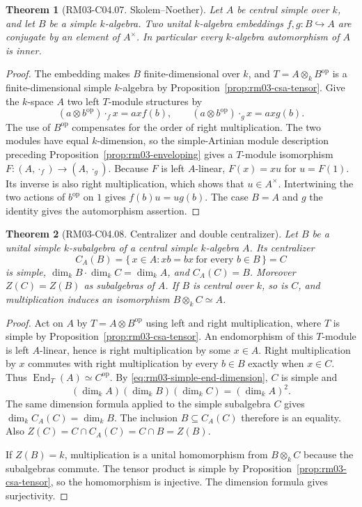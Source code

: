 \documentclass[11pt,oneside,openany]{book}
\newtheorem{theorem}{Theorem}[chapter]
\theoremstyle{definition}
\theoremstyle{remark}
\begin{document}
\begin{theorem}[RM03-C04.07. Skolem--Noether]
\label{thm:rm03-skolem-noether}
Let \(A\) be central simple over \(k\), and let \(B\) be a
simple \(k\)-algebra. Two unital \(k\)-algebra embeddings
\(f,g:B\hookrightarrow A\) are conjugate by an element of \(A^\times\).
In particular every \(k\)-algebra automorphism of \(A\) is inner.
\end{theorem}
\begin{proof}
The embedding makes \(B\) finite-dimensional over \(k\), and
\(T=A\otimes_k B^{\mathrm{op}}\) is a finite-dimensional simple
\(k\)-algebra by Proposition~\ref{prop:rm03-csa-tensor}.
Give the \(k\)-space \(A\) two left \(T\)-module structures by
\[
 (a\otimes b^{\mathrm{op}})\cdot_f x=axf(b),\qquad
 (a\otimes b^{\mathrm{op}})\cdot_g x=axg(b).
\]
The use of \(B^{\mathrm{op}}\) compensates for the order of right
multiplication. The two modules have equal \(k\)-dimension, so the
simple-Artinian module description preceding
Proposition~\ref{prop:rm03-enveloping} gives a \(T\)-module
isomorphism \(F:(A,\cdot_f)\to(A,\cdot_g)\).
Because \(F\) is left \(A\)-linear, \(F(x)=xu\) for \(u=F(1)\).
Its inverse is also right multiplication, which shows that
\(u\in A^\times\). Intertwining the two actions of \(b^{\mathrm{op}}\)
on \(1\) gives \(f(b)u=ug(b)\). The case \(B=A\) and \(g\) the
identity gives the automorphism assertion.
\end{proof}

\begin{theorem}[RM03-C04.08. Centralizer and double centralizer]
\label{thm:rm03-centralizer}
Let \(B\) be a unital simple \(k\)-subalgebra of a central simple
\(k\)-algebra \(A\). Its centralizer
\[
 C_A(B)=\{\,x\in A:xb=bx\ \text{for every }b\in B\,\}=C
\]
is simple, \(\dim_k B\cdot\dim_k C=\dim_k A\), and \(C_A(C)=B\).
Moreover \(Z(C)=Z(B)\) as subalgebras of \(A\).
If \(B\) is central over \(k\), so is \(C\), and multiplication
induces an isomorphism \(B\otimes_k C\simeq A\).
\end{theorem}
\begin{proof}
Act on \(A\) by \(T=A\otimes B^{\mathrm{op}}\) using left and right
multiplication, where \(T\) is simple by
Proposition~\ref{prop:rm03-csa-tensor}. An endomorphism of this
\(T\)-module is left \(A\)-linear, hence is right multiplication
by some \(x\in A\). Right multiplication by \(x\) commutes with
right multiplication by every \(b\in B\) exactly when \(x\in C\).
Thus \(\operatorname{End}_T(A)\simeq C^{\mathrm{op}}\).
By \eqref{eq:rm03-simple-end-dimension}, \(C\) is simple and
\[
 (\dim_k A)(\dim_k B)(\dim_k C)=(\dim_k A)^2.
\]
The same dimension formula applied to the simple subalgebra
\(C\) gives \(\dim_k C_A(C)=\dim_k B\). The inclusion
\(B\subseteq C_A(C)\) therefore is an equality. Also
\(Z(C)=C\cap C_A(C)=C\cap B=Z(B)\).

If \(Z(B)=k\), multiplication is a unital homomorphism from
\(B\otimes_k C\) because the subalgebras commute. The tensor
product is simple by Proposition~\ref{prop:rm03-csa-tensor},
so the homomorphism is injective. The dimension formula gives
surjectivity.
\end{proof}
\end{document}
